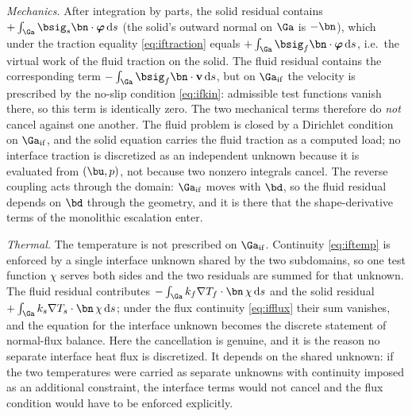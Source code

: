\emph{Mechanics.} After integration
by parts, the solid residual contains $+\int_{\Ga}\bsig_s\bn\cdot\boldsymbol\varphi\,\mathrm ds$
(the solid's outward normal on $\Ga$ is $-\bn$), which under the traction equality
\eqref{eq:iftraction} equals $+\int_{\Ga}\bsig_f\bn\cdot\boldsymbol\varphi\,\mathrm ds$, i.e.\ the
virtual work of the fluid traction on the solid. The fluid residual contains the corresponding term
$-\int_{\Ga}\bsig_f\bn\cdot\mathbf v\,\mathrm ds$, but on $\Ga_{\mathrm{if}}$ the velocity is
prescribed by the no-slip condition \eqref{eq:ifkin}: admissible test functions vanish there, so
this term is identically zero. The two mechanical terms therefore do \emph{not} cancel against one
another. The fluid problem is closed by a Dirichlet condition on $\Ga_{\mathrm{if}}$, and the solid
equation carries the fluid traction as a computed load; no interface traction is discretized as an
independent unknown because it is evaluated from $(\bu,p)$, not because two nonzero integrals
cancel. The reverse coupling acts through the domain: $\Ga_{\mathrm{if}}$ moves with $\bd$, so the
fluid residual depends on $\bd$ through the geometry, and it is there that the shape-derivative
terms of the monolithic escalation enter.

\emph{Thermal.} The temperature is not prescribed on $\Ga_{\mathrm{if}}$. Continuity
\eqref{eq:iftemp} is enforced by a single interface unknown shared by the two subdomains, so one
test function $\chi$ serves both sides and the two residuals are summed for that unknown. The fluid
residual contributes $-\int_{\Ga}k_f\nabla T_f\cdot\bn\,\chi\,\mathrm ds$ and the solid residual
$+\int_{\Ga}k_s\nabla T_s\cdot\bn\,\chi\,\mathrm ds$; under the flux continuity \eqref{eq:ifflux}
their sum vanishes, and the equation for the interface unknown becomes the discrete statement of
normal-flux balance. Here the cancellation is genuine, and it is the reason no separate interface
heat flux is discretized. It depends on the shared unknown: if the two temperatures were carried as
separate unknowns with continuity imposed as an additional constraint, the interface terms would not
cancel and the flux condition would have to be enforced explicitly.

